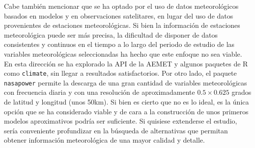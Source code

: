 \documentclass[12pt,a4paper,]{book}
\numberwithin{dummy}{section}
\theoremstyle{ocrenumbox}
\theoremstyle{blacknumex}
\theoremstyle{blacknumbox}
\theoremstyle{ocrenum}
\theoremstyle{ocrenum}
\begin{document}
Cabe también mencionar que se ha optado por el uso de datos
meteorológicos basados en modelos y en observaciones satelitares, en
lugar del uso de datos provenientes de estaciones meteorológicas. Si
bien la información de estaciones meteorológica puede ser más precisa,
la dificultad de disponer de datos consistentes y continuos en el tiempo
a lo largo del periodo de estudio de las variables meteorológicas
seleccionadas ha hecho que este enfoque no sea viable. En esta dirección
se ha explorado la API de la AEMET y algunos paquetes de R como
\texttt{climate}, sin llegar a resultados satisfactorios. Por otro lado,
el paquete \texttt{nasapower} permite la descarga de una gran cantidad
de variables meteorológicas con frecuencia diaria y con una resolución
de aproximadamente \(0.5 \times 0.625\) grados de latitud y longitud
(unos 50km). Si bien es cierto que no es lo ideal, es la única opción
que se ha considerado viable y de cara a la construcción de unos
primeros modelos aproximativos podría ser suficiente. Si quisiese
extenderse el estudio, sería conveniente profundizar en la búsqueda de
alternativas que permitan obtener información meteorológica de una mayor
calidad y detalle.
\end{document}
